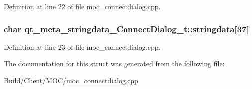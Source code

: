 Definition at line 22 of file moc\+\_\+connectdialog.\+cpp.

\hypertarget{structqt__meta__stringdata___connect_dialog__t_ac4488fe4adc309e0d0c6dcb072f5ac8f}{}
\subsubsection[{stringdata}]{\setlength{\rightskip}{0pt plus 5cm}char qt\+\_\+meta\+\_\+stringdata\+\_\+\+Connect\+Dialog\+\_\+t\+::stringdata\mbox{[}37\mbox{]}}\label{structqt__meta__stringdata___connect_dialog__t_ac4488fe4adc309e0d0c6dcb072f5ac8f}


Definition at line 23 of file moc\+\_\+connectdialog.\+cpp.



The documentation for this struct was generated from the following file\+:\begin{DoxyCompactItemize}
\item 
Build/\+Client/\+M\+O\+C/\hyperlink{moc__connectdialog_8cpp}{moc\+\_\+connectdialog.\+cpp}\end{DoxyCompactItemize}

